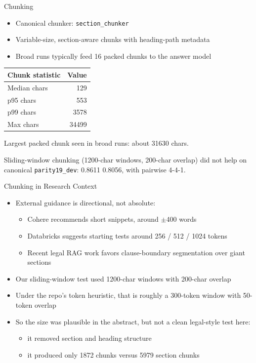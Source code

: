 \documentclass[aspectratio=169]{beamer}
\begin{document}
\begin{frame}{Chunking}
  \begin{itemize}
    \item Canonical chunker: \texttt{section\_chunker}
    \item Variable-size, section-aware chunks with heading-path metadata
    \item Broad runs typically feed 16 packed chunks to the answer model
  \end{itemize}

  \vspace{0.5em}
  \centering
  \begin{tabular}{lr}
    \toprule
    Chunk statistic & Value \\
    \midrule
    Median chars & 129 \\
    p95 chars & 553 \\
    p99 chars & 3578 \\
    Max chars & 34499 \\
    \bottomrule
  \end{tabular}

  \vspace{0.5em}
  Largest packed chunk seen in broad runs: about 31630 chars.

  \vspace{0.3em}
  Sliding-window chunking (1200-char windows, 200-char overlap) did not help
  on canonical \texttt{parity19\_dev}: 0.8611 \textrightarrow{} 0.8056, with
  pairwise 4-4-1.
\end{frame}

\begin{frame}{Chunking in Research Context}
  \begin{itemize}
    \item External guidance is directional, not absolute:
      \begin{itemize}
        \item Cohere recommends short snippets, around $\pm$400 words
        \item Databricks suggests starting tests around 256 / 512 / 1024 tokens
        \item Recent legal RAG work favors clause-boundary segmentation over giant sections
      \end{itemize}
    \item Our sliding-window test used 1200-char windows with 200-char overlap
    \item Under the repo's token heuristic, that is roughly a 300-token window with 50-token overlap
    \item So the size was plausible in the abstract, but not a clean legal-style test here:
      \begin{itemize}
        \item it removed section and heading structure
        \item it produced only 1872 chunks versus 5979 section chunks
      \end{itemize}
  \end{itemize}
\end{frame}
\end{document}

